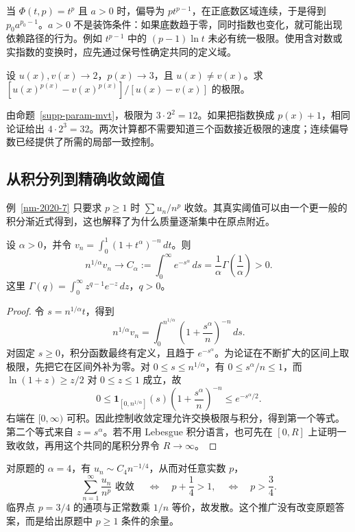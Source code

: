 \documentclass[UTF8,12pt,a4paper,fontset=fandol]{ctexart}
\begin{document}
当 $\Phi(t,p)=t^p$ 且 $a>0$ 时，偏导为 $pt^{p-1}$，在正底数区域连续，于是得到 $p_0a^{p_0-1}$。$a>0$ 不是装饰条件：如果底数趋于零，同时指数也变化，就可能出现依赖路径的行为。例如 $t^{p-1}$ 中的 $(p-1)\ln t$ 未必有统一极限。使用含对数或实指数的变换时，应先通过保号性确定共同的定义域。

\begin{example}
设 $u(x),v(x)\to2$，$p(x)\to3$，且 $u(x)\ne v(x)$。求 $[u(x)^{p(x)}-v(x)^{p(x)}]/[u(x)-v(x)]$ 的极限。
\end{example}
\begin{solve}
由命题~\ref{supp-param-mvt}，极限为 $3\cdot2^2=12$。如果把指数换成 $p(x)+1$，相同论证给出 $4\cdot2^3=32$。两次计算都不需要知道三个函数接近极限的速度；连续偏导数已经提供了所需的局部一致控制。
\end{solve}

\subsection{从积分列到精确收敛阈值}
例~\ref{nm-2020-7} 只要求 $p\geq1$ 时 $\sum u_n/n^p$ 收敛。其真实阈值可以由一个更一般的积分渐近式得到，这也解释了为什么质量逐渐集中在原点附近。

\begin{theorem}[端点集中的幂尺度]\label{supp-boundary-scale}
设 $\alpha>0$，并令 $v_n=\int_0^1(1+t^\alpha)^{-n}\,dt$。则
\[
 n^{1/\alpha}v_n\longrightarrow
 C_\alpha:=\int_0^\infty e^{-s^\alpha}\,ds
 =\frac1\alpha\Gamma\left(\frac1\alpha\right)>0.
\]
这里 $\Gamma(q)=\int_0^\infty z^{q-1}e^{-z}\,dz$，$q>0$。
\end{theorem}
\begin{proof}
令 $s=n^{1/\alpha}t$，得到
\[
 n^{1/\alpha}v_n=\int_0^{n^{1/\alpha}}
 \left(1+\frac{s^\alpha}{n}\right)^{-n}\,ds.
\]
对固定 $s\geq0$，积分函数最终有定义，且趋于 $e^{-s^\alpha}$。为论证在不断扩大的区间上取极限，先把它在区间外补为零。对 $0\leq s\leq n^{1/\alpha}$，有 $0\leq s^\alpha/n\leq1$，而 $\ln(1+z)\geq z/2$ 对 $0\leq z\leq1$ 成立，故
\[
 0\leq\mathbf1_{[0,n^{1/\alpha}]}(s)
 \left(1+\frac{s^\alpha}{n}\right)^{-n}\leq e^{-s^\alpha/2}.
\]
右端在 $[0,\infty)$ 可积。因此控制收敛定理允许交换极限与积分，得到第一个等式。第二个等式来自 $z=s^\alpha$。若不用 Lebesgue 积分语言，也可先在 $[0,R]$ 上证明一致收敛，再用这个共同的尾积分界令 $R\to\infty$。
\end{proof}

对原题的 $\alpha=4$，有 $u_n\sim C_4n^{-1/4}$，从而对任意实数 $p$，
\[
 \sum_{n=1}^\infty\frac{u_n}{n^p}
 \text{ 收敛 }\quad\Longleftrightarrow\quad p+\frac14>1,
 \quad\Longleftrightarrow\quad p>\frac34.
\]
临界点 $p=3/4$ 的通项与正常数乘 $1/n$ 等价，故发散。这个推广没有改变原题答案，而是给出原题中 $p\geq1$ 条件的余量。
\end{document}
